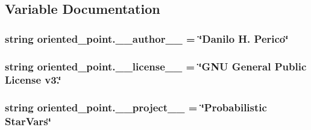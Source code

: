 \subsection{Variable Documentation}
\hypertarget{namespaceoriented__point_aa3b4d2d674d85c3cbe62dd838254d6d0}{
\subsubsection[{\-\_\-\-\_\-author\-\_\-\-\_\-}]{\setlength{\rightskip}{0pt plus 5cm}string oriented\-\_\-point.\-\_\-\-\_\-author\-\_\-\-\_\- = \char`\"{}Danilo H. Perico\char`\"{}}}\label{namespaceoriented__point_aa3b4d2d674d85c3cbe62dd838254d6d0}
\hypertarget{namespaceoriented__point_a3d6cc46d63eaa6bbf92eff2835e6a1c2}{
\subsubsection[{\-\_\-\-\_\-license\-\_\-\-\_\-}]{\setlength{\rightskip}{0pt plus 5cm}string oriented\-\_\-point.\-\_\-\-\_\-license\-\_\-\-\_\- = \char`\"{}G\-N\-U General Public License v3.\char`\"{}}}\label{namespaceoriented__point_a3d6cc46d63eaa6bbf92eff2835e6a1c2}
\hypertarget{namespaceoriented__point_a9691eace975baee6e55c7185dc3bb251}{
\subsubsection[{\-\_\-\-\_\-project\-\_\-\-\_\-}]{\setlength{\rightskip}{0pt plus 5cm}string oriented\-\_\-point.\-\_\-\-\_\-project\-\_\-\-\_\- = \char`\"{}Probabilistic Star\-Vars\char`\"{}}}\label{namespaceoriented__point_a9691eace975baee6e55c7185dc3bb251}
